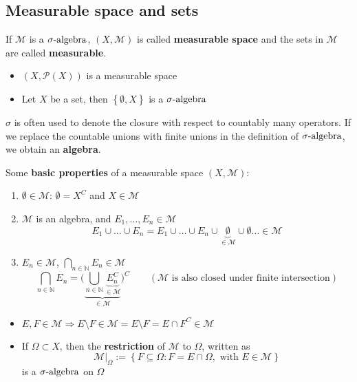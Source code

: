 \subsection{Measurable space and sets}
If \(\mathcal{M}\) is a \(\sigma\mbox{-algebra}\), \((X, \mathcal{M})\) is called \textbf{measurable space} and the sets in \(\mathcal{M}\) are called \textbf{measurable}.  
\begin{example}
    \begin{itemize}
        \item \((X, \mathcal{P}(X))\) is a measurable space
        \item Let \(X\) be a set, then \(\left\lbrace \emptyset, X \right\rbrace\) is a \(\sigma\mbox{-algebra}\)
    \end{itemize}
\end{example}
\begin{remark}
    \(\sigma\) is often used to denote the closure with respect to countably many operators. If we replace the countable unions with finite unions in the definition of \(\sigma\mbox{-algebra}\), we obtain an \textbf{algebra}.
\end{remark}
Some \textbf{basic properties} of a measurable space \((X, \mathcal{M})\):
\begin{enumerate}
    \item \(\emptyset \in \mathcal{M}\): \(\emptyset = X^C\) and \(X \in \mathcal{M}\)
    \item \(\mathcal{M}\) is an algebra, and \(E_1, \ldots, E_n \in \mathcal{M}\)
    \[
        E_1 \cup \ldots \cup E_n = E_1 \cup \ldots \cup E_n \cup \underbrace{\emptyset}_{\in \mathcal{M}} \cup \emptyset \ldots \in \mathcal{M} 
    \]
    \item \(E_n \in \mathcal{M}\), \(\bigcap_{n \in \mathbb{N}} E_n \in \mathcal{M}\)
    \[
        \bigcap_{n \in \mathbb{N}} E_n = \biggl(\underbrace{\bigcup_{n \in \mathbb{N}} \underbrace{E_n^C}_{\in \mathcal{M}}}_{\in \mathcal{M}}\biggr)^C \qquad (\mathcal{M} \mbox{ is also closed under finite intersection})
    \]
    \end{enumerate}
\begin{itemize}
    \item \(E, F \in \mathcal{M} \Rightarrow E \setminus F \in \mathcal{M} = E \setminus F = E \cap F^C \in \mathcal{M}\)
    \item If \(\Omega \subset X\), then the \textbf{restriction} of \(\mathcal{M}\) to \(\Omega\), written as \[\mathcal{M}\vert_{\Omega} := \left\lbrace F \subseteq \Omega: F = E \cap \Omega, \mbox{ with } E \in \mathcal{M} \right\rbrace\] is a \(\sigma\mbox{-algebra}\) on \(\Omega\)
\end{itemize}
